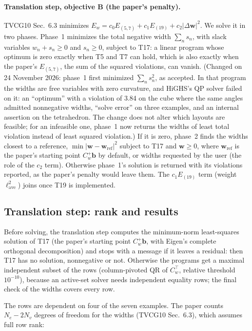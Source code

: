 \documentclass[11pt]{article}
\theoremstyle{definition}
\begin{document}
\paragraph{Translation step, objective B (the paper's penalty).} TVCG10
Sec.~6.3 minimizes $E_w = c_0E_{(5,7)} + c_1E_{(19)} + c_2|\Delta\mathbf w|^2$.
We solve it in two phases. Phase~1 minimizes the total negative width
$\sum_n s_n$, with slack variables $w_n + s_n \ge 0$ and $s_n \ge 0$, subject
to T17: a linear program whose optimum is zero exactly when T5 and T7 can
hold, which is also exactly when the paper's $E_{(5,7)}$, the sum of the
squared violations, can vanish. (Changed on 24 November 2026: phase~1 first
minimized $\sum_n s_n^2$, as accepted. In that program the widths are free
variables with zero curvature, and HiGHS's QP solver failed on it: an
``optimum'' with a violation of 3.84 on the cube where the same angles
admitted nonnegative widths, ``solve error'' on three examples, and an
internal assertion on the tetrahedron. The change does not alter which
layouts are feasible; for an infeasible one, phase~1 now returns the widths
of least total violation instead of least squared violation.) If it is zero,
phase~2 finds
the widths closest to a reference, $\min |\mathbf w - \mathbf w_{\mathrm{ref}}|^2$
subject to T17 and $\mathbf w \ge 0$, where $\mathbf w_{\mathrm{ref}}$ is the
paper's starting point $C_w^+\mathbf b$ by default, or widths requested by the
user (the role of the $c_2$ term). Otherwise phase~1's solution is returned
with its violations reported, as the paper's penalty would leave them. The
$c_1E_{(19)}$ term (weight $\ell_{\mathrm{ave}}^2$) joins once T19 is
implemented.

\subsection{Translation step: rank and results}

Before solving, the translation step computes the minimum-norm least-squares
solution of T17 (the paper's starting point $C_w^+\mathbf b$, with Eigen's
complete orthogonal decomposition) and stops with a message if it leaves a
residual: then T17 has no solution, nonnegative or not. Otherwise the programs
get a maximal independent subset of the rows (column-pivoted QR of $C_w^\top$,
relative threshold $10^{-10}$), because an active-set solver needs independent
equality rows; the final check of the widths covers every row.

The rows are dependent on four of the seven examples. The paper counts
$N_e - 2N_v$ degrees of freedom for the widths (TVCG10 Sec.~6.3), which
assumes full row rank:
\end{document}
